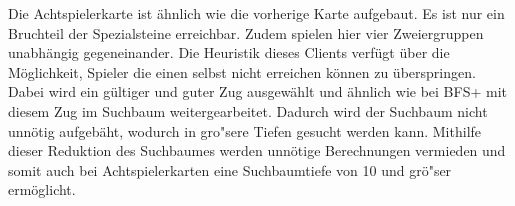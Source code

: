Die Achtspielerkarte ist \"ahnlich wie die vorherige Karte aufgebaut.
Es ist nur ein Bruchteil der Spezialsteine erreichbar.
Zudem spielen hier vier Zweiergruppen unabh\"angig gegeneinander.
Die Heuristik dieses Clients verf\"ugt \"uber die M\"oglichkeit, Spieler die einen selbst nicht erreichen k\"onnen zu \"uberspringen.
Dabei wird ein g\"ultiger und guter Zug ausgew\"ahlt und \"ahnlich wie bei BFS+ mit diesem Zug im Suchbaum weitergearbeitet.
Dadurch wird der Suchbaum nicht unn\"otig aufgeb\"aht, wodurch in gro"sere Tiefen gesucht werden kann.
Mithilfe dieser Reduktion des Suchbaumes werden unn\"otige Berechnungen vermieden und somit auch bei Achtspielerkarten eine Suchbaumtiefe von 10 und gr\"o"ser erm\"oglicht.

\bigskip
\newpage